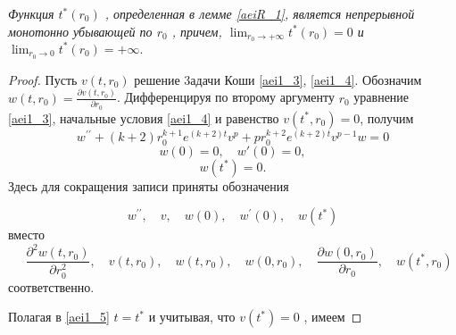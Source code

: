 \begin{lemma}\label{aeiR_2}
\textit{ Функция $ t^*(r_0) $ , определенная в лемме \ref{aeiR_1},
является непрерывной монотонно убывающей по $ r_0 $ , причем, $
\displaystyle \lim_{r_0 \to +\infty}t^{*}(r_0)=0 $  и $
\displaystyle \lim_{r_0 \to 0}t^{*}(r_0)=+\infty.$}
\end{lemma}
\begin{proof}
Пусть $ v(t,r_0) $ решение 3адачи Коши \eqref{aei1_3},
\eqref{aei1_4}. Обозначим $ w(t,r_0)=\frac {\partial v(t, r_0)}{\partial r_0} $. 
Дифференцируя по второму аргументу $ r_0 $ уравнение \eqref{aei1_3},
начальные условия \eqref{aei1_4} и равенство $ v(t^*, r_0)=0 $, получим
\begin{equation}\label{aei1_8}
w^{\prime\prime}+(k+2)r_0^{k+1}e^{(k+2)t}v^p+pr_0^{k+2}e^{(k+2)t}v^{p-1}w=0
\end{equation}
\begin{equation}\label{aei1_9}
w(0)=0, \quad w{ \prime}(0)=0,
\end{equation}
\begin{equation}\label{aei1_10}
w(t^*)=0.
\end{equation}
Здесь  для сокращения записи приняты обозначения

$$
w^{\prime\prime},\quad v,\quad w(0),\quad w^{\prime}(0),\quad w(t^*)
$$
 вместо
 $$ \quad \frac {\partial^2w(t,r_0)}{\partial r_0^2},
\quad v(t,r_0),\quad w(t,r_0),\quad w(0,r_0),\quad \frac {\partial
w(0,r_0)}{\partial r_0},\quad w(t^*,r_0)
$$
соответственно.

Полагая в \eqref{aei1_5} $ t=t^* $  и учитывая, что $ v(t^*)=0 $ , имеем


\end{proof}
